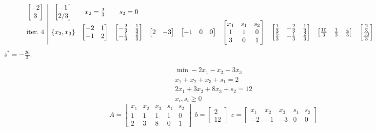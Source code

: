 \begin{equation*}
{\begin{array}{ c|c c c c c c c c c c c c c }
\begin{bmatrix}
-2\\
3
\end{bmatrix} & \begin{bmatrix}
-1\\
2/3
\end{bmatrix} & x_{2} =\frac{2}{3} & s_{2} =0\\
\text{iter.} \ 4 & \{x_{2} ,x_{3}\} & \begin{bmatrix}
-2 & 1\\
-1 & 2
\end{bmatrix} & \begin{bmatrix}
-\frac{2}{3} & \frac{1}{3}\\
-\frac{1}{3} & \frac{2}{3}
\end{bmatrix} & \begin{bmatrix}
2 & -3
\end{bmatrix} & \begin{bmatrix}
-1 & 0 & 0
\end{bmatrix} & \begin{bmatrix}
x_{1} & s_{1} & s_{2}\\
1 & 1 & 0\\
3 & 0 & 1
\end{bmatrix} & \begin{bmatrix}
\frac{1}{3} & -\frac{2}{3} & \frac{1}{3}\\
\frac{5}{3} & -\frac{1}{3} & \frac{2}{3}
\end{bmatrix} & \begin{bmatrix}
\frac{10}{3} & \frac{1}{3} & \frac{4}{3}
\end{bmatrix} & \begin{bmatrix}
\frac{2}{3}\\
\frac{10}{3}
\end{bmatrix} &  &  &  & 
\end{array}
}
\end{equation*}
$z^{*} =-\frac{26}{3}$.

\Es
\begin{gather*}
\min -2x_{1} -x_{2} -3x_{3}\\
x_{1} +x_{2} +x_{3} +s_{1} =2\\
2x_{1} +3x_{2} +8x_{3} +s_{2} =12\\
x_{i} ,s_{i} \geq 0
\end{gather*}
\begin{equation*}
A=\begin{bmatrix}
x_{1} & x_{2} & x_{3} & s_{1} & s_{2}\\
1 & 1 & 1 & 1 & 0\\
2 & 3 & 8 & 0 & 1
\end{bmatrix} \ \ b=\begin{bmatrix}
2\\
12
\end{bmatrix} \ \ c=\begin{bmatrix}
x_{1} & x_{2} & x_{3} & s_{1} & s_{2}\\
-2 & -1 & -3 & 0 & 0
\end{bmatrix}
\end{equation*}

